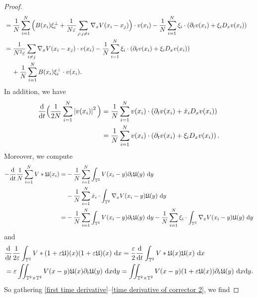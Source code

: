 \documentclass[11pt,reqno]{amsart}
\numberwithin{equation}{section}
\def\dd{{\rm d}}
\begin{document}
\begin{proof}
\begin{align}
&=\frac{1}{N}\sum_{i=1}^{N}
\Big(B(x_{i})\xi_{i}^{\perp}+\frac{1}{N\varepsilon}\sum_{j:j\neq i}\nabla_{x} V(x_{i}-x_{j})\Big)\cdot v(x_{i})-\frac{1}{N}\sum_{i=1}^{N}\xi_{i}\cdot (\partial_{t}v(x_{i})+\xi_{i}D_{x}v(x_{i}))& \notag\\
&=\frac{1}{N^{2}\varepsilon}\sum_{i\neq j}\nabla_{x} V(x_{i}-x_{j})\cdot v(x_{i})
-\frac{1}{N}\sum_{i=1}^{N}\xi_{i}\cdot(\partial_{t}v(x_{i})+\xi_{i}D_{x}v(x_{i})) \notag\\
&\quad\,+\frac{1}{N}\sum_{i=1}^{N}B(x_{i})\xi_{i}^{\perp}\cdot v(x_{i}). \label{first time derivative}
\end{align}
In addition, we have  
\begin{align}
\frac{\dd}{\dd t}\Big(\frac{1}{2N}\sum_{i=1}^{N}\left\vert v(x_{i})\right\vert^{2} \Big)
&=\frac{1}{N}\sum_{i=1}^{N}v(x_{i})\cdot\left(\partial_{t}v(x_{i})+\dot x_{i}D_{x}v(x_{i})\right) \notag\\
&=\frac{1}{N}\sum_{i=1}^{N}v(x_{i})\cdot\left(\partial_{t}v(x_{i})+\xi_{i}D_{x}v(x_{i})\right). \label{second time derivative}
\end{align}
Moreover, we compute 
\begin{align}
-\frac{\dd}{\dd t}\frac{1}{N}\sum_{i=1}^{N}V\ast \mathfrak{U}(x_{i})=&-\frac{1}{N}\sum_{i=1}^{N}\int_{\mathbb{T}^{2}} V(x_{i}-y)\partial_{t}\mathfrak{U}(y)\ \dd y \notag\\
&-\frac{1}{N}\sum_{i=1}^{N}\dot x_{i}\cdot \int_{\mathbb{T}^{2}} \nabla_{x} V(x_{i}-y)\mathfrak{U}(y)\ \dd y \notag\\
=& -\frac{1}{N}\sum_{i=1}^
{N}\int_{\mathbb{T}^{2}} V(x_{i}-y)\partial_{t}\mathfrak{U}(y)\ \dd y-\frac{1}{N}\sum_{i=1}^{N}\xi_{i}\cdot \int_{\mathbb{T}^{2}} \nabla_{x} V(x_{i}-y)\mathfrak{U}(y)\ \dd y 
\end{align}
and 
\begin{align}&
\frac{\dd}{\dd t}\frac{1}{2\varepsilon}\int_{\mathbb{T}^{2}} V\ast (1+\varepsilon\mathfrak{U})(x)(1+\varepsilon \mathfrak{U})(x)\ \dd x \notag=\frac{\varepsilon}{2}\frac{\dd}{\dd t}\int_{\mathbb{T}^{2}} V\ast \mathfrak{U}(x)\mathfrak{U}(x)\ \dd x\\
&=\varepsilon\iint_{\mathbb{T}^{2}\times \mathbb{T}^{2}}V(x-y)\mathfrak{U}(x)\partial_{t}\mathfrak{U}(y)\ \dd x\dd y=\iint_{\mathbb{T}^{2}\times \mathbb{T}^{2}} V(x-y)(1+\varepsilon\mathfrak{U}(x))\partial_{t}\mathfrak{U}(y)\ \dd x\dd y. 
\label{time derivative of corrector 2}
\end{align}
So gathering \eqref{first time derivative}--\eqref{time derivative of corrector 2},
we find 

\end{proof}
\end{document}
